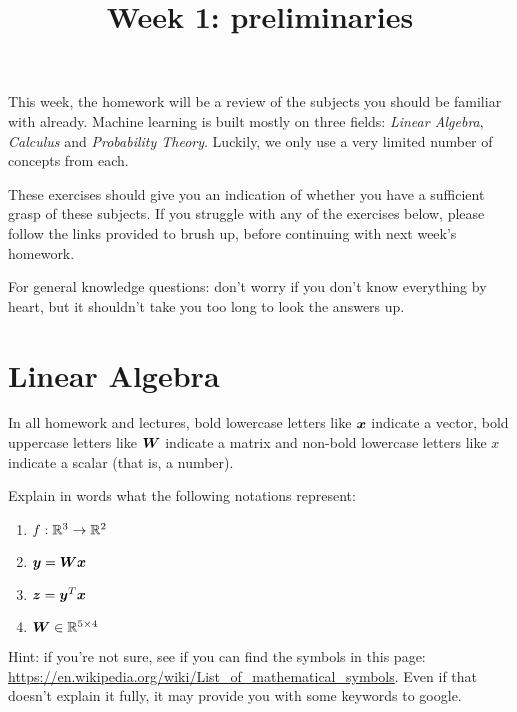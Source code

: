 \documentclass[11pt]{article}
\title{Week 1: preliminaries}
\begin{document}
\maketitle

\noindent This week, the homework will be a review of the subjects you should be familiar with already. Machine learning is built mostly on three fields: \emph{Linear Algebra}, \emph{Calculus} and \emph{Probability Theory}. Luckily, we only use a very limited number of concepts from each.

These exercises should give you an indication of whether you have a sufficient grasp of these subjects. If you struggle with any of the exercises below, please follow the links provided to brush up, before continuing with next week's homework. 

For general knowledge questions: don't worry if you don't know everything by heart, but it shouldn't take you too long to look the answers up.

\section{Linear Algebra}

In all homework and lectures, bold lowercase letters like ${\bm x}$ indicate a vector, bold uppercase letters like ${\bm W}$ indicate a matrix and non-bold lowercase letters like $x$ indicate a scalar (that is, a number).

\begin{Exercise}
\noindent Explain in words what the following notations represent:

\begin{enumerate}
\item $f: {\mathbb R}^3 \to {\mathbb R}^2$ 
\item ${\bm y} = {\bm W} {\bm x}$ 
\item ${\bm z} = {\bm y}^T{\bm x}$ 
\item ${\bm W} \in {\mathbb R}^{5 \times 4}$ 
\end{enumerate}

Hint: if you're not sure, see if you can find the symbols in this page: \url{https://en.wikipedia.org/wiki/List_of_mathematical_symbols}. Even if that doesn't explain it fully, it may provide you with some keywords to google.
\end{Exercise}
\end{document}
